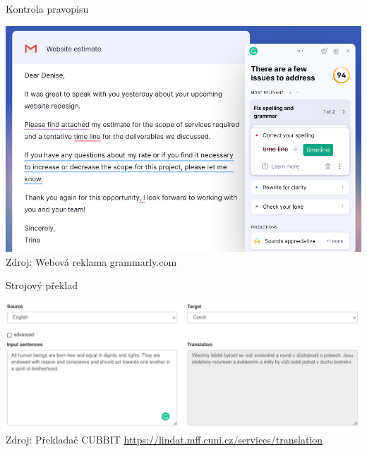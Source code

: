 \documentclass[handout,aspectratio=169,dvipsnames]{beamer}
\begin{document}
\begin{frame}{Kontrola pravopisu}

    \centering
    \includegraphics[scale=.3]{img/grammarly.png} \\
    {\tiny Zdroj: Webová reklama grammarly.com}

\end{frame}


\begin{frame}{Strojový překlad}

    \centering
    \includegraphics[scale=.4]{img/lindat.png} \\
    {\tiny Zdroj: Překladač CUBBIT \url{https://lindat.mff.cuni.cz/services/translation} \citep{popel2020transforming}}

\end{frame}
\end{document}
